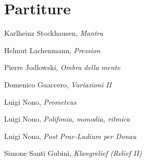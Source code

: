 
\chapter{Partiture}
\label{chp:Partiture}

Karlheinz Stockhausen, \textit{Mantra}

Helmut Lachenmann, \textit{Pression}

Pierre Jodlowski, \textit{Ombra della mente}

Domenico Guaccero, \textit{Variazioni II}

Luigi Nono, \textit{Prometeus}

Luigi Nono, \textit{Polifonia, monodia, ritmica}

Luigi Nono, \textit{Post Prae-Ludium per Donau}

Simone Santi Gubini, \textit{Klangrelief (Relief II)}
